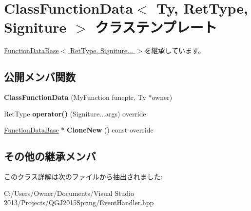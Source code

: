 \hypertarget{class_class_function_data}{}\section{Class\+Function\+Data$<$ Ty, Ret\+Type, Signiture $>$ クラステンプレート}
\label{class_class_function_data}


\hyperlink{class_function_data_base}{Function\+Data\+Base$<$ Ret\+Type, Signiture... $>$}を継承しています。

\subsection*{公開メンバ関数}
\begin{DoxyCompactItemize}
\item 
{\bfseries Class\+Function\+Data} (My\+Function funcptr, Ty $\ast$owner)\hypertarget{class_class_function_data_abefe5d100570c3c1f0c652af6328b4f0}{}\label{class_class_function_data_abefe5d100570c3c1f0c652af6328b4f0}

\item 
Ret\+Type {\bfseries operator()} (Signiture...\+args) override\hypertarget{class_class_function_data_aa240023070c2abd8db3226eb543f7996}{}\label{class_class_function_data_aa240023070c2abd8db3226eb543f7996}

\item 
\hyperlink{class_function_data_base}{Function\+Data\+Base} $\ast$ {\bfseries Clone\+New} () const  override\hypertarget{class_class_function_data_acafbcb11e23f759b82c5f0400f0aed6f}{}\label{class_class_function_data_acafbcb11e23f759b82c5f0400f0aed6f}

\end{DoxyCompactItemize}
\subsection*{その他の継承メンバ}


このクラス詳解は次のファイルから抽出されました\+:\begin{DoxyCompactItemize}
\item 
C\+:/\+Users/\+Owner/\+Documents/\+Visual Studio 2013/\+Projects/\+Q\+G\+J2015\+Spring/Event\+Handler.\+hpp\end{DoxyCompactItemize}
